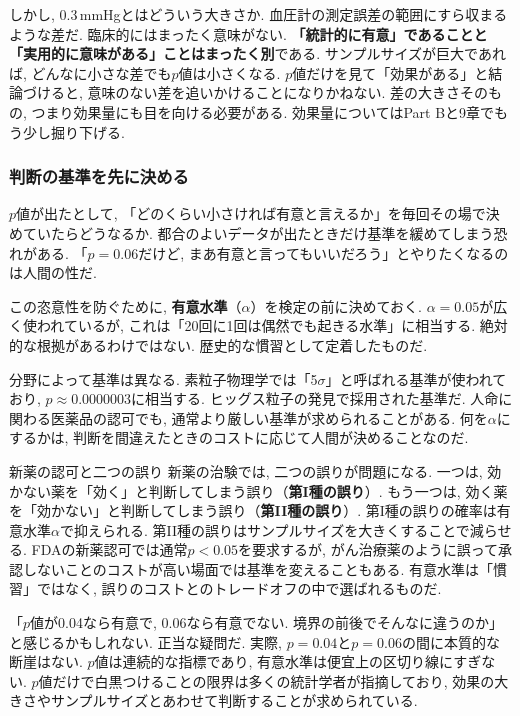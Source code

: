    しかし, 0.3\,mmHgとはどういう大きさか.
    血圧計の測定誤差の範囲にすら収まるような差だ.
    臨床的にはまったく意味がない.
    \textbf{「統計的に有意」であることと「実用的に意味がある」ことはまったく別}である.
    サンプルサイズが巨大であれば, どんなに小さな差でも$p$値は小さくなる.
    $p$値だけを見て「効果がある」と結論づけると, 意味のない差を追いかけることになりかねない.
    差の大きさそのもの, つまり効果量にも目を向ける必要がある.
    効果量についてはPart Bと9章でもう少し掘り下げる.

    \subsubsection*{判断の基準を先に決める}

    $p$値が出たとして, 「どのくらい小さければ有意と言えるか」を毎回その場で決めていたらどうなるか.
    都合のよいデータが出たときだけ基準を緩めてしまう恐れがある.
    「$p = 0.06$だけど, まあ有意と言ってもいいだろう」とやりたくなるのは人間の性だ.

    この恣意性を防ぐために, \textbf{有意水準}（$\alpha$）を検定の前に決めておく.
    $\alpha = 0.05$が広く使われているが, これは「20回に1回は偶然でも起きる水準」に相当する.
    絶対的な根拠があるわけではない.
    歴史的な慣習として定着したものだ.

    分野によって基準は異なる.
    素粒子物理学では「5$\sigma$」と呼ばれる基準が使われており, $p \approx 0.0000003$に相当する.
    ヒッグス粒子の発見で採用された基準だ.
    人命に関わる医薬品の認可でも, 通常より厳しい基準が求められることがある.
    何を$\alpha$にするかは, 判断を間違えたときのコストに応じて人間が決めることなのだ.

    \begin{mybox}{新薬の認可と二つの誤り}
      新薬の治験では, 二つの誤りが問題になる.
      一つは, 効かない薬を「効く」と判断してしまう誤り（\textbf{第I種の誤り}）.
      もう一つは, 効く薬を「効かない」と判断してしまう誤り（\textbf{第II種の誤り}）.
      第I種の誤りの確率は有意水準$\alpha$で抑えられる.
      第II種の誤りはサンプルサイズを大きくすることで減らせる.
      FDAの新薬認可では通常$p < 0.05$を要求するが,
      がん治療薬のように誤って承認しないことのコストが高い場面では基準を変えることもある.
      有意水準は「慣習」ではなく, 誤りのコストとのトレードオフの中で選ばれるものだ.
    \end{mybox}

    「$p$値が0.04なら有意で, 0.06なら有意でない. 境界の前後でそんなに違うのか」と感じるかもしれない.
    正当な疑問だ.
    実際, $p = 0.04$と$p = 0.06$の間に本質的な断崖はない.
    $p$値は連続的な指標であり, 有意水準は便宜上の区切り線にすぎない.
    $p$値だけで白黒つけることの限界は多くの統計学者が指摘しており,
    効果の大きさやサンプルサイズとあわせて判断することが求められている.


